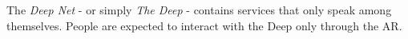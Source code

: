 The \emph{Deep Net} - or simply \emph{The Deep} - contains services that only speak among themselves.
People are expected to interact with the Deep only through the AR.
